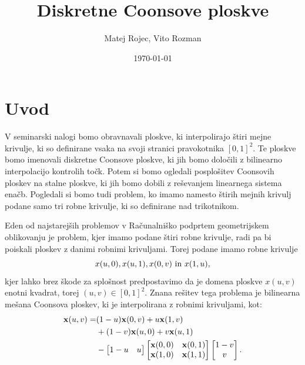 \documentclass[a4paper,12pt]{article}
\begin{document}
\newcommand{\N}{\mathbb{N}}
\newcommand{\R}{\mathbb{R}}
\newcommand\sbullet[1][.5]{\mathbin{\vcenter{\hbox{\scalebox{#1}{$\bullet$}}}}}
\newtheorem{definicija}{Definicija}[section]
\newtheorem{primer}[definicija]{Primer}
\newtheorem{opomba}[definicija]{Opomba}

\title{Diskretne Coonsove ploskve}
\author{Matej Rojec, Vito Rozman}
\date{\today}

\maketitle

\newpage

\tableofcontents
\listoffigures

\newpage

\section{Uvod}

V seminarski nalogi bomo obravnavali ploskve, ki interpolirajo štiri mejne krivulje,
ki so definirane vsaka na svoji stranici pravokotnika $[0,1]^2$. 
Te ploskve bomo imenovali diskretne Coonsove ploskve, 
ki jih bomo določili z bilinearno interpolacijo kontrolih točk.
Potem si bomo ogledali posplošitev
Coonsovih ploskev na stalne ploskve, ki jih bomo dobili 
z reševanjem linearnega sistema enačb. Pogledali si bomo tudi problem, ko imamo namesto štirih mejnih 
krivulj podane samo tri robne krivulje, ki so definirane nad trikotnikom.

Eden od najstarejših problemov v Računalniško podprtem geometrijskem oblikovanju je problem, 
kjer imamo podane štiri robne krivulje, radi pa bi poiskali ploskev z danimi robnimi krivuljami. 
Torej podane imamo robne krivulje $$x(u,0), x(u,1), x(0,v) ~\textnormal{in}~  x(1,u),$$ kjer lahko brez škode za 
splošnost predpostavimo da je domena ploskve $x(u,v)$ enotni kvadrat, torej $(u,v) \in [0,1]^2$. 
Znana rešitev tega problema je bilinearna mešana Coonsova ploskev, ki je interpolirana z robnimi 
krivuljami, kot:
\begin{align}
   \label{continiusCons}
   \mathbf{x}(u,v) =& (1-u)\mathbf{x}(0,v) +u\mathbf{x}(1,v) \notag \\
    & + (1-v)\mathbf{x}(u,0) +v\mathbf{x}(u,1)   \\
   & - 
   \begin{bmatrix} 
      1-u & u 
   \end{bmatrix}
   \begin{bmatrix} 
      \mathbf{x}(0,0)& \mathbf{x}(0,1) \notag \\
      \mathbf{x}(1,0)& \mathbf{x}(1,1) 
   \end{bmatrix}
   \begin{bmatrix}
      1-v\\
      v
   \end{bmatrix}.
\end{align}
\end{document}
